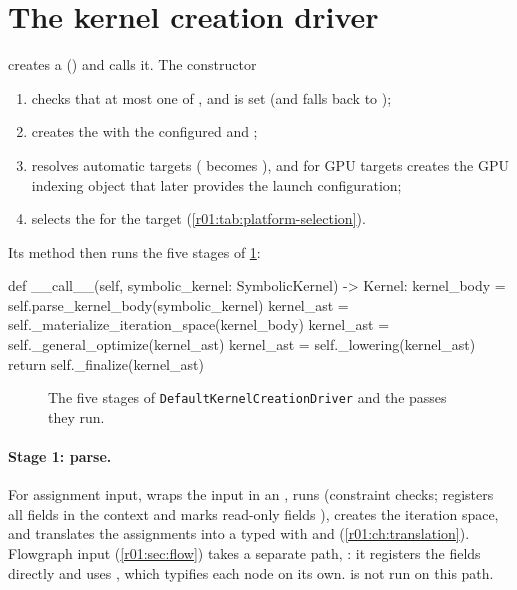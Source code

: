\section{The kernel creation driver}\label{r01:sec:driver}

 creates a 
() and calls it. The constructor
\begin{enumerate}
  \item checks that at most one of ,  and
         is set (and falls back to );
  \item creates the  with the configured 
        and ;
  \item resolves automatic targets ( becomes ), and for
        GPU targets creates the GPU indexing object that later provides the launch
        configuration;
  \item selects the  for the target (\cref{r01:tab:platform-selection}).
\end{enumerate}
Its  method then runs the five stages of \cref{r01:fig:pipeline}:
\begin{pycode}
def __call__(self, symbolic_kernel: SymbolicKernel) -> Kernel:
    kernel_body = self.parse_kernel_body(symbolic_kernel)
    kernel_ast = self._materialize_iteration_space(kernel_body)
    kernel_ast = self._general_optimize(kernel_ast)
    kernel_ast = self._lowering(kernel_ast)
    return self._finalize(kernel_ast)
\end{pycode}

\begin{figure}[htbp]
  \centering
  
  \caption[The five stages of the kernel creation driver]{The five stages of \texttt{DefaultKernelCreationDriver} and the passes they run.}
  \label{r01:fig:pipeline}
\end{figure}

\paragraph{Stage 1: parse.}
For assignment input,  wraps the input in an
, runs  (constraint checks; registers all
fields in the context and marks read-only fields ), creates the iteration
space, and translates the assignments into a typed  with
 and  (\cref{r01:ch:translation}). Flowgraph input
(\cref{r01:sec:flow}) takes a separate path, : it registers the fields
directly and uses , which typifies each node on its own.
 is not run on this path.

